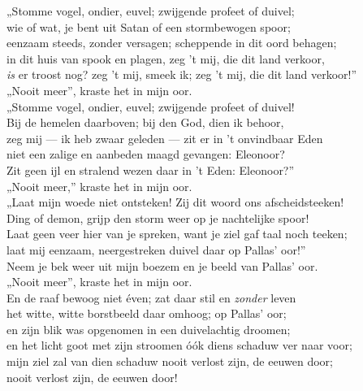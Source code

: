\documentclass{memoir}
\begin{document}
\begin{multicols}{2}
\noindent „Stomme vogel, ondier, euvel; zwijgende profeet of duivel;\\
wie of wat, je bent uit Satan of een stormbewogen spoor;\\
eenzaam steeds, zonder versagen; scheppende in dit oord behagen;\\
in dit huis van spook en plagen, zeg 't mij, die dit land verkoor,\\
{\itshape is} er troost nog? zeg 't mij, smeek ik; zeg 't mij, die dit land verkoor!”\\
\indent\indent „Nooit meer”, kraste het in mijn oor.\\

\noindent „Stomme vogel, ondier, euvel; zwijgende profeet of duivel!\\
Bij de hemelen daarboven; bij den God, dien ik behoor,\\
zeg mij — ik heb zwaar geleden — zit er in 't onvindbaar Eden\\
niet een zalige en aanbeden maagd gevangen: Eleonoor?\\
Zit geen ijl en stralend wezen daar in 't Eden: Eleonoor?”\\
\indent\indent „Nooit meer,” kraste het in mijn oor.\\

\noindent „Laat mijn woede niet ontsteken! Zij dit woord ons afscheidsteeken!\\
Ding of demon, grijp den storm weer op je nachtelijke spoor!\\
Laat geen veer hier van je spreken, want je ziel gaf taal noch teeken;\\
laat mij eenzaam, neergestreken duivel daar op Pallas' oor!”\\
Neem je bek weer uit mijn boezem en je beeld van Pallas' oor.\\
\indent\indent„Nooit meer”, kraste het in mijn oor.\\

\noindent En de raaf bewoog niet éven; zat daar stil en {\itshape zonder} leven\\
het witte, witte borstbeeld daar omhoog; op Pallas' oor;\\
en zijn blik was opgenomen in een duivelachtig droomen;\\
en het licht goot met zijn stroomen óók diens schaduw ver naar voor;\\
mijn ziel zal van dien schaduw nooit verlost zijn, de eeuwen door;\\
\indent\indent nooit verlost zijn, de eeuwen door!\\

\end{multicols}
\end{document}
